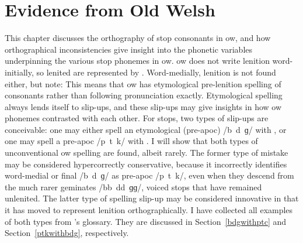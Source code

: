 \chapter{Evidence from Old Welsh}
\label{oldwelsh}
This chapter discusses the orthography of stop consonants in \gls{ow}, and how orthographical inconsistencies give insight into the phonetic variables underpinning the various stop phonemes in \gls{ow}.  \Gls{ow} does not write lenition word-initially, so lenited  are represented by . Word-medially, lenition is not found either, but note: 
This means that \gls{ow} has etymological pre-lenition spelling of consonants rather than following pronunciation exactly. Etymological spelling always lends itself to slip-ups, and these slip-ups may give insights in how \gls{ow} phonemes contrasted with each other. For stops, two types of slip-ups are conceivable: one may either spell an etymological (pre-\gls{apoc}) /b~d~ɡ/ with , or one may spell a pre-\gls{apoc} /p~t~k/ with . I will show that both types of unconventional \gls{ow} spelling are found, albeit rarely. The former type of mistake may be considered hypercorrectly conservative, because it incorrectly identifies word-medial or final /b~d~ɡ/ as pre-\gls{apoc} /p~t~k/, even when they descend from the much rarer geminates /bb~dd~ɡɡ/, \ie voiced stops that have remained unlenited. The latter type of spelling slip-up may be considered innovative in that it has moved to represent lenition orthographically. I have collected all examples of both types from \textcite{falileyev_etymological_2000}'s glossary. They are discussed in Section~\ref{bdgwithptc} and Section~\ref{ptkwithbdg}, respectively.





